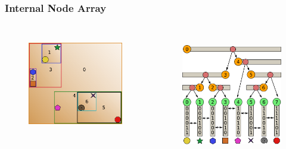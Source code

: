 \documentclass{beamer}
\begin{document}
\begin{frame}
  \frametitle{Internal Node Array}
  
\begin{columns}[t]

\begin{figure}
\includegraphics[height=45mm]{primitive-box.png}
\end{figure}

\begin{figure}
\includegraphics[height=55mm]{full_tree_arrays_narrow.png}
\end{figure}
\end{columns}
\end{frame}
\end{document}

